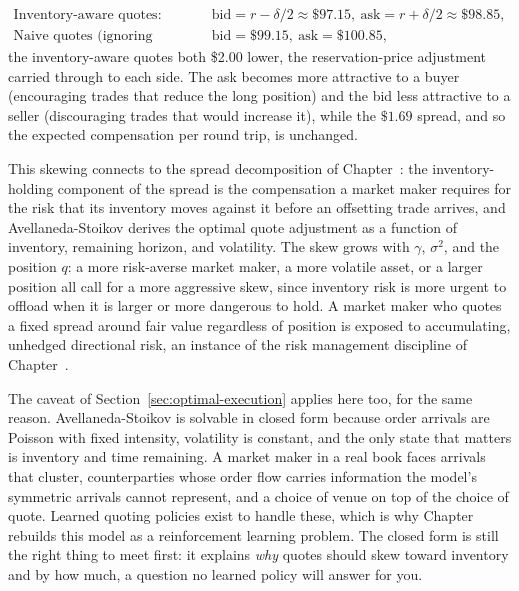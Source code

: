 \documentclass[../ai_in_finance]{subfiles}
\begin{document}
\begin{align*}
\text{Inventory-aware quotes:} &\quad \text{bid} = r-\delta/2\approx\$97.15, \ \text{ask} = r+\delta/2\approx\$98.85, \\
\text{Naive quotes (ignoring inventory):} &\quad \text{bid} = \$99.15, \ \text{ask} = \$100.85,
\end{align*}
the inventory-aware quotes both \$2.00 lower, the reservation-price adjustment carried through to each side. The ask becomes more attractive to a buyer (encouraging trades that reduce the long position) and the bid less attractive to a seller (discouraging trades that would increase it), while the $\$1.69$ spread, and so the expected compensation per round trip, is unchanged.

This skewing connects to the spread decomposition of Chapter~: the inventory-holding component of the spread is the compensation a market maker requires for the risk that its inventory moves against it before an offsetting trade arrives, and Avellaneda-Stoikov derives the optimal quote adjustment as a function of inventory, remaining horizon, and volatility. The skew grows with $\gamma$, $\sigma^2$, and the position $q$: a more risk-averse market maker, a more volatile asset, or a larger position all call for a more aggressive skew, since inventory risk is more urgent to offload when it is larger or more dangerous to hold. A market maker who quotes a fixed spread around fair value regardless of position is exposed to accumulating, unhedged directional risk, an instance of the risk management discipline of Chapter~.

The caveat of Section~\ref{sec:optimal-execution} applies here too, for the same reason. Avellaneda-Stoikov is solvable in closed form because order arrivals are Poisson with fixed intensity, volatility is constant, and the only state that matters is inventory and time remaining. A market maker in a real book faces arrivals that cluster, counterparties whose order flow carries information the model's symmetric arrivals cannot represent, and a choice of venue on top of the choice of quote. Learned quoting policies exist to handle these, which is why Chapter~ rebuilds this model as a reinforcement learning problem. The closed form is still the right thing to meet first: it explains \emph{why} quotes should skew toward inventory and by how much, a question no learned policy will answer for you.
\end{document}
